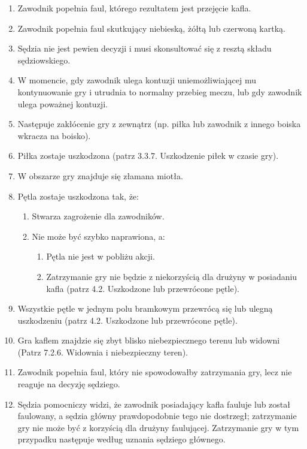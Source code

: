 \documentclass[12pt]{article}
\begin{document}
\begin{enumerate}
\item Zawodnik popełnia faul, którego rezultatem jest przejęcie kafla.

\item Zawodnik popełnia faul skutkujący niebieską, żółtą lub czerwoną
kartką.

\item Sędzia nie jest pewien decyzji i musi skonsultować się z resztą
składu sędziowskiego.

\item W momencie, gdy zawodnik ulega kontuzji uniemożliwiającej mu
kontynuowanie gry i utrudnia to normalny przebieg meczu, lub gdy
zawodnik ulega poważnej kontuzji.

\item Następuje zakłócenie gry z zewnątrz (np. piłka lub zawodnik z innego
boiska wkracza na boisko).

\item Piłka zostaje uszkodzona (patrz 3.3.7. Uszkodzenie piłek w czasie
gry).

\item W obszarze gry znajduje się złamana miotła.

\item Pętla zostaje uszkodzona tak, że:
\begin{enumerate}
\item Stwarza zagrożenie dla zawodników.

\item Nie może być szybko naprawiona, a:

\begin{enumerate}
\item
    Pętla nie jest w pobliżu akcji.
  \item
    Zatrzymanie gry nie będzie z niekorzyścią dla drużyny w posiadaniu
  kafla (patrz 4.2. Uszkodzone lub przewrócone pętle).
  \end{enumerate}
\end{enumerate}
\item Wszystkie pętle w jednym polu bramkowym przewrócą się lub ulegną
uszkodzeniu (patrz 4.2. Uszkodzone lub przewrócone pętle).

\item Gra kaflem znajdzie się zbyt blisko niebezpiecznego terenu lub
widowni (Patrz 7.2.6. Widownia i niebezpieczny teren).

\item Zawodnik popełnia faul, który nie spowodowałby zatrzymania gry, lecz
nie reaguje na decyzję sędziego.

\item Sędzia pomocniczy widzi, że zawodnik posiadający kafla fauluje lub
został faulowany, a sędzia główny prawdopodobnie tego nie dostrzegł;
zatrzymanie gry nie może być z korzyścią dla drużyny faulującej.
Zatrzymanie gry w tym przypadku następuje według uznania sędziego
głównego.
\end{enumerate}
\end{document}
